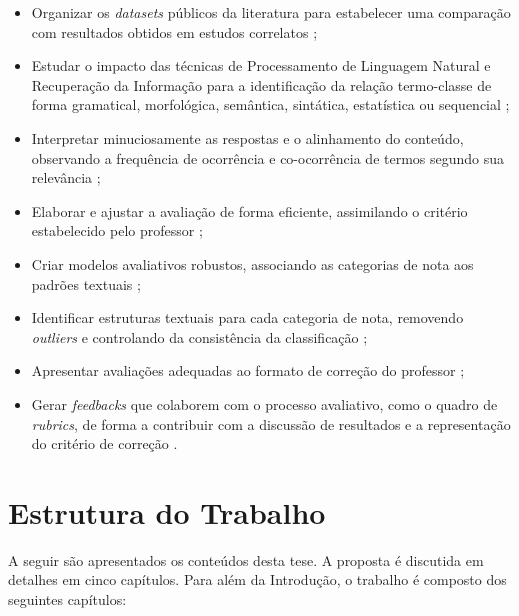 \begin{itemize}
\item Organizar os \textit{datasets} públicos da literatura para estabelecer uma comparação com resultados obtidos em estudos correlatos \cite{burrows2015};
\item Estudar o impacto das técnicas de Processamento de Linguagem Natural e Recuperação da Informação para a identificação da relação termo-classe de forma gramatical, morfológica, semântica, sintática, estatística ou sequencial \cite{galhardi2018a, kumar2019, sahu2020};
\item Interpretar minuciosamente as respostas e o alinhamento do conteúdo, observando a frequência de ocorrência e co-ocorrência de termos segundo sua relevância \cite{jordan2012, saha2018, ding2020};
\item Elaborar e ajustar a avaliação de forma eficiente, assimilando o critério estabelecido pelo professor \cite{zesch2015, condor2020, lui2022};
\item Criar modelos avaliativos robustos, associando as categorias de nota aos padrões textuais \cite{butcher2010, heilman2015, burrows2015};
\item Identificar estruturas textuais para cada categoria de nota, removendo \textit{outliers} e controlando da consistência da classificação \cite{ding2020, filighera2020};
\item Apresentar avaliações adequadas ao formato de correção do professor \cite{higgins2014, funayama2020, pado2021};
\item Gerar \textit{feedbacks} que colaborem com o processo avaliativo, como o quadro de \textit{rubrics}, de forma a contribuir com a discussão de resultados e a representação do critério de correção \cite{mizumoto2019, suzen2020, bernius2022}.
\end{itemize}


\section{Estrutura do Trabalho}

A seguir são apresentados os conteúdos desta tese. A proposta é discutida em detalhes em cinco capítulos. Para além da Introdução, o trabalho é composto dos seguintes capítulos:

